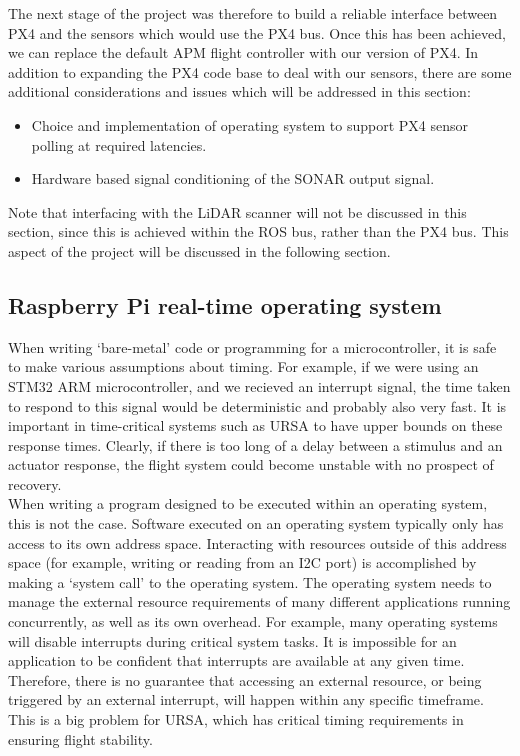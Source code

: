 \documentclass[capstone_report.tex]{subfiles}
\begin{document}
    The next stage of the project was therefore to build a reliable interface between PX4 and the sensors which would use the PX4 bus. Once this has been achieved, we can replace the default APM flight controller with our version of PX4. In addition to expanding the PX4 code base to deal with our sensors, there are some additional considerations and issues which will be addressed in this section: 
    \begin{itemize}
        \item Choice and implementation of operating system to support PX4 sensor polling at required latencies.
        \item Hardware based signal conditioning of the SONAR output signal.
    \end{itemize}

    Note that interfacing with the LiDAR scanner will not be discussed in this section, since this is achieved within the ROS bus, rather than the PX4 bus. This aspect of the project will be discussed in the following section.\\

    \subsection{Raspberry Pi real-time operating system}
    When writing `bare-metal' code or programming for a microcontroller, it is safe to make various assumptions about timing. For example, if we were using an STM32 ARM microcontroller, and we recieved an interrupt signal, the time taken to respond to this signal would be deterministic and probably also very fast. It is important in time-critical systems such as URSA to have upper bounds on these response times. Clearly, if there is too long of a delay between a stimulus and an actuator response, the flight system could become unstable with no prospect of recovery. \\

    When writing a program designed to be executed within an operating system, this is not the case. Software executed on an operating system typically only has access to its own address space. Interacting with resources outside of this address space (for example, writing or reading from an I2C port) is accomplished by making a `system call' to the operating system. The operating system needs to manage the external resource requirements of many different applications running concurrently, as well as its own overhead. For example, many operating systems will disable interrupts during critical system tasks. It is impossible for an application to be confident that interrupts are available at any given time. Therefore, there is no guarantee that accessing an external resource, or being triggered by an external interrupt, will happen within any specific timeframe. This is a big problem for URSA, which has critical timing requirements in ensuring flight stability.\\
\end{document}
